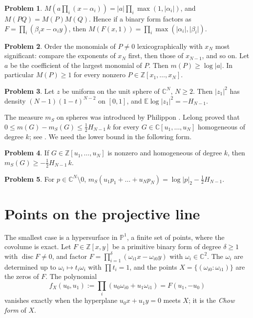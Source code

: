 \documentclass[reqno]{amsart}
\theoremstyle{definition}
\newtheorem{problem}{Problem}[section]
\theoremstyle{plain}
\newcommand{\Z}{\mathbb{Z}}
\newcommand{\C}{\mathbb{C}}
\newcommand{\Pb}{\mathbb{P}}
\newcommand{\disc}{\operatorname{disc}}
\newcommand{\mS}{m_{S}}
\begin{document}
\begin{problem}\label{pr:jensen}
\(M(a \prod_i (x - \alpha_i)) = \lvert a \rvert \prod_i \max(1, \lvert\alpha_i\rvert)\), and \(M(PQ) = M(P)M(Q)\).  Hence if a binary form factors as \(F = \prod_i (\beta_i x - \alpha_i y)\), then \(M(F(x,1)) = \prod_i \max(\lvert\alpha_i\rvert, \lvert\beta_i\rvert)\).
\end{problem}

\begin{problem}\label{pr:lex}
Order the monomials of \(P \ne 0\) lexicographically with \(x_N\) most significant: compare the exponents of \(x_N\) first, then those of \(x_{N-1}\), and so on.  Let \(a\) be the coefficient of the largest monomial of \(P\).  Then \(m(P) \ge \log\lvert a \rvert\).  In particular \(M(P) \ge 1\) for every nonzero \(P \in \Z[x_1, \dots, x_N]\).
\end{problem}

\begin{problem}\label{pr:beta}
Let \(z\) be uniform on the unit sphere of \(\C^N\), \(N \ge 2\).  Then \(\lvert z_1 \rvert^2\) has density \((N-1)(1-t)^{N-2}\) on \([0,1]\), and \(\mathbb E \log\lvert z_1 \rvert^2 = -H_{N-1}\).
\end{problem}

The measure \(\mS\) on spheres was introduced by Philippon \cite{Ph1}.  Lelong \cite{Le} proved that \(0 \le m(G) - \mS(G) \le \frac12 H_{N-1}\, k\) for every \(G \in \C[u_1, \dots, u_N]\) homogeneous of degree \(k\); see \cite[(1.2)]{KPS}.  We need the lower bound in the following form.

\begin{problem}\label{pr:sphere-torus}
If \(G \in \Z[u_1, \dots, u_N]\) is nonzero and homogeneous of degree \(k\), then \(\mS(G) \ge -\tfrac12 H_{N-1}\, k\).
\end{problem}

\begin{problem}\label{pr:sphere-linear}
For \(p \in \C^N \setminus 0\), \(\mS(u_1p_1 + \dots + u_Np_N) = \log\lvert p \rvert_2 - \tfrac12 H_{N-1}\).
\end{problem}

\section{Points on the projective line}\label{sec:points}

The smallest case is a hypersurface in \(\Pb^1\), a finite set of points, where the covolume is exact.  Let \(F \in \Z[x, y]\) be a primitive binary form of degree \(\delta \ge 1\) with \(\disc F \ne 0\), and factor \(F = \prod_{i=1}^{\delta} (\omega_{i1}x - \omega_{i0}y)\) with \(\omega_i \in \C^2\).  The \(\omega_i\) are determined up to \(\omega_i \mapsto t_i\omega_i\) with \(\prod t_i = 1\), and the points \(X = \{(\omega_{i0} : \omega_{i1})\}\) are the zeros of \(F\).  The polynomial
\[
  f_X(u_0, u_1) := \prod_i (u_0\omega_{i0} + u_1\omega_{i1}) = F(u_1, -u_0)
\]
vanishes exactly when the hyperplane \(u_0x + u_1y = 0\) meets \(X\); it is the \emph{Chow form} of \(X\).
\end{document}
